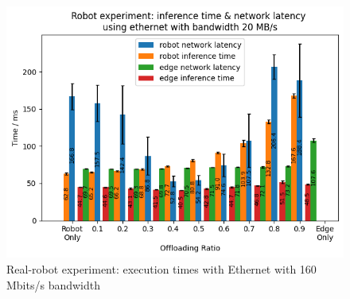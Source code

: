 
\begin{figure}
    \centering
    \includegraphics[width=\linewidth]{figures/experiment/real_robot/eth/execution_time_160.png}
    \caption{Real-robot experiment: execution times with Ethernet with 160 Mbits/s bandwidth}
    \label{fig:real_robot_experiment:eth_execution_time_160}
\end{figure}

